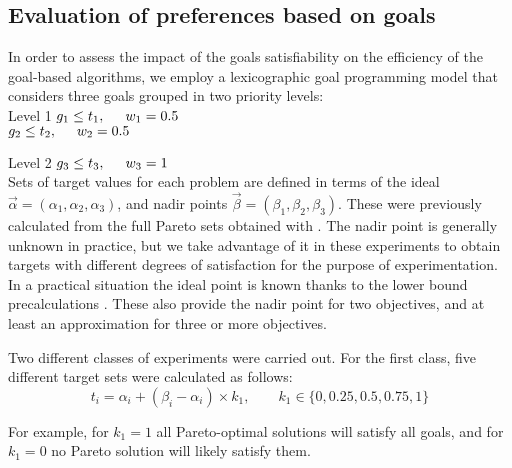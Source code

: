 \subsection{Evaluation of preferences based on goals}
\label{chapMultiObjTestBeds:subsec:Performance}

In order to assess the impact of the goals satisfiability on the efficiency of the goal-based algorithms, we employ a lexicographic goal programming model that considers three goals grouped in two priority levels: \\
 
Level 1 \hspace{10 mm} $g_1 \leq t_1, \hspace{5 mm} w_{1} = 0.5$ \\
\hphantom{a} \hspace{26 mm} $g_2 \leq t_2, \hspace{5 mm} w_{2} = 0.5$ 

Level 2 \hspace{10 mm} $g_3 \leq t_3, \hspace{5 mm} w_{3} = 1$ \\

Sets of target values for each problem are defined in terms of the ideal  $\vec \alpha = (\alpha_1, \alpha_2, \alpha_3)$, and  nadir points  $\vec \beta = (\beta_1, \beta_2, \beta_3)$. These were previously calculated from the full Pareto sets obtained with \namoa. The nadir point is generally unknown in practice, but we take advantage of it in these experiments to obtain targets with different degrees of satisfaction for the purpose of experimentation. In a practical situation the ideal point is known thanks to the lower bound precalculations \citep{Tung1992}. These also provide the nadir point for two objectives, and at least an approximation for three or more objectives.

Two different classes of experiments were carried out. For the first class, five different target sets were calculated as follows: 
\begin{equation} \label{eq:targets}
t_i = \alpha_i + (\beta_i - \alpha_i) \times k_1, \qquad k_1 \in \{ 0, 0.25, 0.5, 0.75, 1 \}  
\end{equation}

For example, for $k_1=1$ all Pareto-optimal solutions will satisfy all goals, and for $k_1=0$ no Pareto solution will likely satisfy them. 

